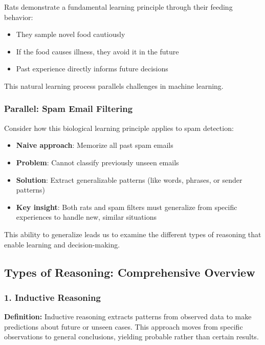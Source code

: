 Rats demonstrate a fundamental learning principle through their feeding behavior:

\begin{itemize}
\item They sample novel food cautiously
\item If the food causes illness, they avoid it in the future
\item Past experience directly informs future decisions
\end{itemize}

This natural learning process parallels challenges in machine learning.

\subsubsection{Parallel: Spam Email Filtering}

Consider how this biological learning principle applies to spam detection:

\begin{itemize}
\item \textbf{Naive approach}: Memorize all past spam emails
\item \textbf{Problem}: Cannot classify previously unseen emails
\item \textbf{Solution}: Extract generalizable patterns (like words, phrases, or sender patterns)
\item \textbf{Key insight}: Both rats and spam filters must generalize from specific experiences to handle new, similar situations
\end{itemize}

This ability to generalize leads us to examine the different types of reasoning that enable learning and decision-making.

\subsection{Types of Reasoning: Comprehensive Overview}

\subsubsection{1. Inductive Reasoning}

\textbf{Definition:} Inductive reasoning extracts patterns from observed data to make predictions about future or unseen cases. This approach moves from specific observations to general conclusions, yielding probable rather than certain results.

